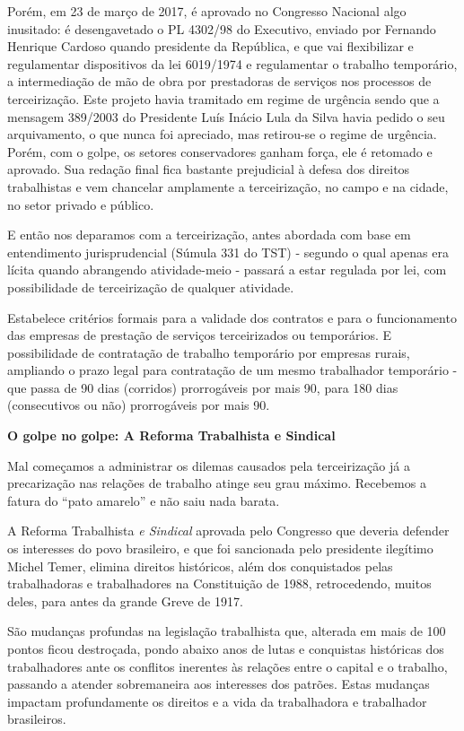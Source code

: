 Porém, em 23 de março de 2017, é aprovado no Congresso Nacional algo
inusitado: é desengavetado o PL 4302/98 do Executivo, enviado por
Fernando Henrique Cardoso quando presidente da República, e que vai
flexibilizar e regulamentar dispositivos da lei 6019/1974 e regulamentar
o trabalho temporário, a intermediação de mão de obra por prestadoras de
serviços nos processos de terceirização. Este projeto havia tramitado em
regime de urgência sendo que a mensagem 389/2003 do Presidente Luís
Inácio Lula da Silva havia pedido o seu arquivamento, o que nunca foi
apreciado, mas retirou-se o regime de urgência. Porém, com o golpe, os
setores conservadores ganham força, ele é retomado e aprovado. Sua
redação final fica bastante prejudicial à defesa dos direitos
trabalhistas e vem chancelar amplamente a terceirização, no campo e na
cidade, no setor privado e público.

E então nos deparamos com a terceirização, antes abordada com base em
entendimento jurisprudencial (Súmula 331 do TST) - segundo o qual apenas
era lícita quando abrangendo atividade-meio - passará a estar regulada
por lei, com possibilidade de terceirização de qualquer atividade.

Estabelece critérios formais para a validade dos contratos e para o
funcionamento das empresas de prestação de serviços terceirizados ou
temporários. E possibilidade de contratação de trabalho temporário por
empresas rurais, ampliando o prazo legal para contratação de um mesmo
trabalhador temporário - que passa de 90 dias (corridos) prorrogáveis
por mais 90, para 180 dias (consecutivos ou não) prorrogáveis por mais
90.

\textbf{O golpe no golpe: A Reforma Trabalhista e Sindical}

Mal começamos a administrar os dilemas causados pela terceirização já a
precarização nas relações de trabalho atinge seu grau máximo. Recebemos
a fatura do ``pato amarelo'' e não saiu nada barata.

A Reforma Trabalhista \emph{e Sindical} aprovada pelo Congresso que
deveria defender os interesses do povo brasileiro, e que foi sancionada
pelo presidente ilegítimo Michel Temer, elimina direitos históricos,
além dos conquistados pelas trabalhadoras e trabalhadores na
Constituição de 1988, retrocedendo, muitos deles, para antes da grande
Greve de 1917.

São mudanças profundas na legislação trabalhista que, alterada em mais
de 100 pontos ficou destroçada, pondo abaixo anos de lutas e conquistas
históricas dos trabalhadores ante os conflitos inerentes às relações
entre o capital e o trabalho, passando a atender sobremaneira aos
interesses dos patrões. Estas mudanças impactam profundamente os
direitos e a vida da trabalhadora e trabalhador brasileiros.

